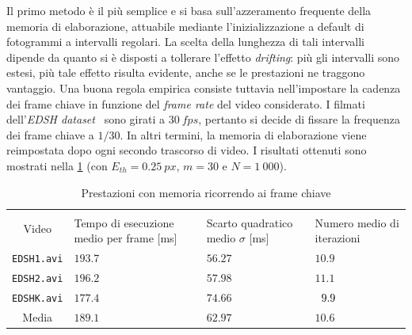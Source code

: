 \documentclass[12pt,a4paper,oneside]{article}
\begin{document}
Il primo metodo è il più semplice e si basa sull'azzeramento frequente della memoria di elaborazione, attuabile mediante l'inizializzazione a default di fotogrammi a intervalli regolari. La scelta della lunghezza di tali intervalli dipende da quanto si è disposti a tollerare l'effetto \textit{drifting}: più gli intervalli sono estesi, più tale effetto risulta evidente, anche se le prestazioni ne traggono vantaggio. Una buona regola empirica consiste tuttavia nell'impostare la cadenza dei frame chiave in funzione del \textit{frame rate} del video considerato. I filmati dell'\textit{EDSH dataset}~\cite{KITANI_HAND_DETECTION} sono girati a $30~fps$, pertanto si decide di fissare la frequenza dei frame chiave a $1/30$. In altri termini, la memoria di elaborazione viene reimpostata dopo ogni secondo trascorso di video. I risultati ottenuti sono mostrati nella \cref{EDSH_videos_key_frames} (con $E_{th} = 0.25~px$, $m = 30$ e $N = 1~000$).
\begin{table}[!htb]
	\renewcommand{\arraystretch}{1.29}
	\centering
	\begin{tabular}{|c||>{\centering\arraybackslash}m{}|>{\centering\arraybackslash}m{}|>{\centering\arraybackslash}m{}|}
	    \hline
		\multirow{2}{*}{\vspace{-6ex}Video}
		& \multicolumn{3}{c|}{VideoSLIC}\\\cline{2-4}
		& Tempo di esecuzione medio per frame [ms] & Scarto quadratico medio $\sigma$ [ms] & Numero medio di iterazioni\\
		\hline\hline
		\texttt{EDSH1.avi} & $193.7$ & $56.27$ & $            10.9$ \\\hline
		\texttt{EDSH2.avi} & $196.2$ & $57.98$ & $            11.1$ \\\hline
		\texttt{EDSHK.avi} & $177.4$ & $74.66$ & $\hspace{.5em}9.9$ \\\hline\hline
		Media              & $189.1$ & $62.97$ & $            10.6$ \\\hline
	\end{tabular}
	\caption{Prestazioni con memoria ricorrendo ai frame chiave}
	\label{EDSH_videos_key_frames}
\end{table}
\end{document}
